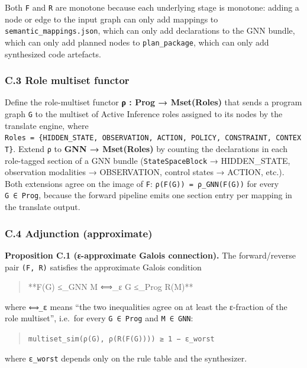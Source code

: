\documentclass[
]{article}
\begin{document}
Both \texttt{F} and \texttt{R} are monotone because each underlying
stage is monotone: adding a node or edge to the input graph can only add
mappings to \texttt{semantic\_mappings.json}, which can only add
declarations to the GNN bundle, which can only add planned nodes to
\texttt{plan\_package}, which can only add synthesized code artefacts.

\subsubsection{C.3 Role multiset
functor}\label{c.3-role-multiset-functor}

Define the role-multiset functor \textbf{ρ : Prog → Mset(Roles)} that
sends a program graph \texttt{G} to the multiset of Active Inference
roles assigned to its nodes by the translate engine, where
\texttt{Roles\ =\ \{HIDDEN\_STATE,\ OBSERVATION,\ ACTION,\ POLICY,\ CONSTRAINT,\ CONTEXT\}}.
Extend \texttt{ρ} to \textbf{GNN → Mset(Roles)} by counting the
declarations in each role-tagged section of a GNN bundle
(\texttt{StateSpaceBlock} → HIDDEN\_STATE, observation modalities →
OBSERVATION, control states → ACTION, etc.). Both extensions agree on
the image of \texttt{F}: \texttt{ρ(F(G))\ =\ ρ\_GNN(F(G))} for every
\texttt{G\ ∈\ Prog}, because the forward pipeline emits one section
entry per mapping in the translate output.

\subsubsection{C.4 Adjunction
(approximate)}\label{c.4-adjunction-approximate}

\textbf{Proposition C.1 (ε-approximate Galois connection).} The
forward/reverse pair \texttt{(F,\ R)} satisfies the approximate Galois
condition

\begin{quote}
**F(G) ≤\_GNN M ⟺\_ε G ≤\_Prog R(M)**
\end{quote}

where \texttt{⟺\_ε} means ``the two inequalities agree on at least the
ε-fraction of the role multiset'', i.e.~for every \texttt{G\ ∈\ Prog}
and \texttt{M\ ∈\ GNN}:

\begin{quote}
\texttt{multiset\_sim(ρ(G),\ ρ(R(F(G))))\ ≥\ 1\ −\ ε\_worst}
\end{quote}

where \texttt{ε\_worst} depends only on the rule table and the
synthesizer.
\end{document}
